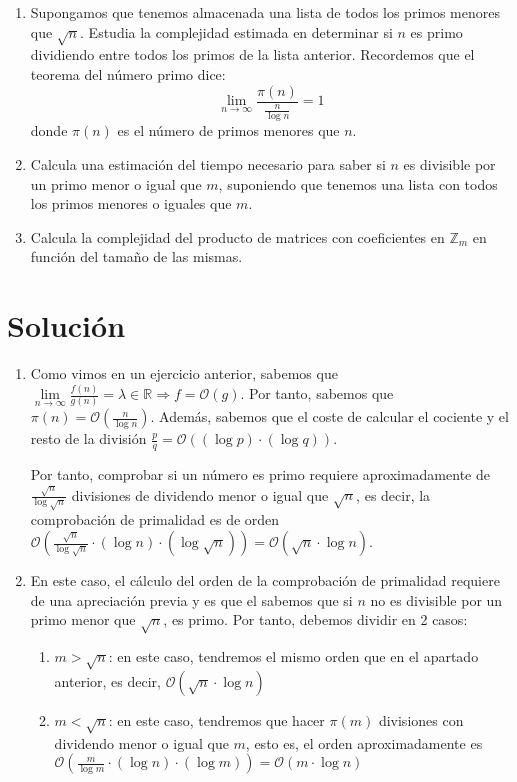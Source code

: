 	\begin{enumerate}
		\item Supongamos que tenemos almacenada una lista de todos los primos menores que $\sqrt{n}$. Estudia la
		complejidad estimada en determinar si $n$ es primo dividiendo entre todos los primos de la lista anterior.
		Recordemos que el teorema del número primo dice:
		$$\lim\limits_{n \rightarrow \infty} \frac{\pi (n)}{\frac{n}{\log n}} = 1$$
		donde $\pi (n)$ es el número de primos menores que $n$.
		\item Calcula una estimación del tiempo necesario para saber si $n$ es divisible por un primo menor o
		igual que $m$, suponiendo que tenemos una lista con todos los primos menores o iguales que $m$.
		\item Calcula la complejidad del producto de matrices con coeficientes en $\mathbb{Z}_m$ en función del
		tamaño de las mismas.
	\end{enumerate}
\section*{Solución}
	\begin{enumerate}
		\item Como vimos en un ejercicio anterior, sabemos que $\lim\limits_{n \rightarrow \infty} \frac{f(n)}
		{g(n)} = \lambda \in \mathbb{R} \Rightarrow f = \mathcal{O}(g)$. Por tanto, sabemos que $\pi (n) =
		\mathcal{O}\left(\frac{n}{\log n}\right)$. Además, sabemos que el coste de calcular el cociente y el
		resto de la división $\frac{p}{q} = \mathcal{O}((\log p) \cdot (\log q))$.
		
		Por tanto, comprobar si un número es primo requiere aproximadamente de $\frac{\sqrt{n}}{\log \sqrt{n}}$
		divisiones de dividendo menor o igual que $\sqrt{n}$, es decir, la comprobación de primalidad es de orden
		$\mathcal{O}\left(\frac{\sqrt{n}}{\log \sqrt{n}} \cdot (\log n) \cdot \left(\log \sqrt{n}\right)\right)
		= \mathcal{O} \left(\sqrt{n} \cdot \log n\right)$.
		
		\item En este caso, el cálculo del orden de la comprobación de primalidad requiere de una apreciación
		previa y es que el sabemos que si $n$ no es divisible por un primo menor que $\sqrt{n}$, es primo.
		Por tanto, debemos dividir en 2 casos:
		\begin{enumerate}
			\item $m > \sqrt{n}$: en este caso, tendremos el mismo orden que en el apartado anterior, es decir,
			$\mathcal{O} \left(\sqrt{n} \cdot \log n\right)$
			\item $m < \sqrt{n}$: en este caso, tendremos que hacer $\pi (m)$ divisiones con dividendo menor o
			igual que $m$, esto es, el orden aproximadamente es $\mathcal{O}\left(\frac{m}{\log m} \cdot
			(\log n) \cdot (\log m)\right) = \mathcal{O} \left(m \cdot \log n\right)$
		\end{enumerate}
	\end{enumerate}
